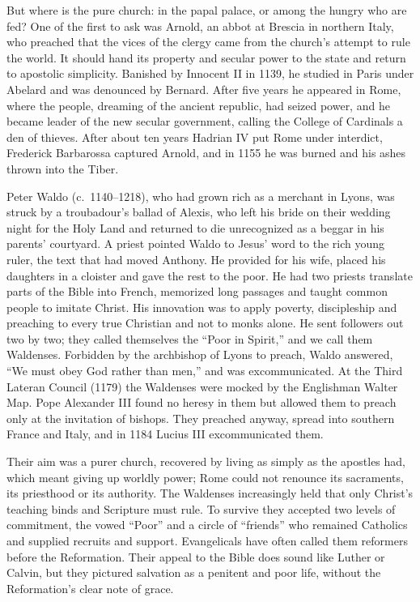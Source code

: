 But where is the pure church: in the papal palace, or among the hungry who are fed? One of the first
to ask was Arnold, an abbot at Brescia in northern Italy, who preached that the vices of the clergy
came from the church's attempt to rule the world. It should hand its property and secular power to
the state and return to apostolic simplicity. Banished by Innocent II in 1139, he studied in Paris
under Abelard and was denounced by Bernard. After five years he appeared in Rome, where the people,
dreaming of the ancient republic, had seized power, and he became leader of the new secular
government, calling the College of Cardinals a den of thieves. After about ten years Hadrian IV put
Rome under interdict, Frederick Barbarossa captured Arnold, and in 1155 he was burned and his ashes
thrown into the Tiber.

Peter Waldo (c.~1140--1218), who had grown rich as a merchant in Lyons, was struck by a troubadour's ballad of Alexis,
who left his bride on their wedding night for the Holy Land and returned to die unrecognized as a
beggar in his parents' courtyard. A priest pointed Waldo to Jesus' word to the rich young ruler, the
text that had moved Anthony. He provided for his wife, placed his daughters in a cloister and gave
the rest to the poor. He had two priests translate parts of the Bible into French, memorized long
passages and taught common people to imitate Christ. His innovation was to apply poverty, discipleship and preaching to every true Christian and not to monks alone. He sent followers out two by two;
they called themselves the ``Poor in Spirit,'' and we call them Waldenses. Forbidden by the archbishop
of Lyons to preach, Waldo answered, ``We must obey God rather than men,'' and was excommunicated. At
the Third Lateran Council (1179) the Waldenses were mocked by the Englishman Walter Map. Pope
Alexander III found no heresy in them but allowed them to preach only at the invitation of bishops.
They preached anyway, spread into southern France and Italy, and in 1184 Lucius III excommunicated
them.

Their aim was a purer church, recovered by living as simply as the apostles had, which meant giving up
worldly power; Rome could not renounce its sacraments, its priesthood or its authority. The
Waldenses increasingly held that only Christ's teaching binds and Scripture must rule. To survive
they accepted two levels of commitment, the vowed ``Poor'' and a circle of ``friends'' who remained
Catholics and supplied recruits and support. Evangelicals have often called them reformers before the
Reformation. Their appeal to the Bible does sound like Luther or Calvin, but they pictured salvation as a penitent and poor life, without the Reformation's clear note of grace.

